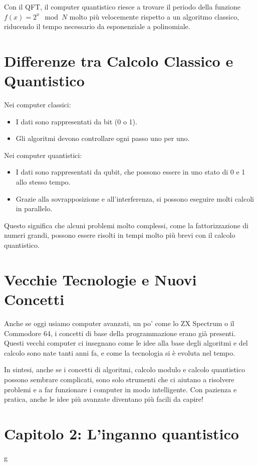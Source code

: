 \documentclass[a4paper,12pt]{book}
\begin{document}
Con il QFT, il computer quantistico riesce a trovare il periodo della funzione \( f(x)=2^x \mod N \) molto più velocemente rispetto a un algoritmo classico, riducendo il tempo necessario da esponenziale a polinomiale.

\section{Differenze tra Calcolo Classico e Quantistico}
Nei computer classici:
\begin{itemize}
  \item I dati sono rappresentati da bit (0 o 1).
  \item Gli algoritmi devono controllare ogni passo uno per uno.
\end{itemize}

Nei computer quantistici:
\begin{itemize}
  \item I dati sono rappresentati da qubit, che possono essere in uno stato di 0 e 1 allo stesso tempo.
  \item Grazie alla sovrapposizione e all'interferenza, si possono eseguire molti calcoli in parallelo.
\end{itemize}

Questo significa che alcuni problemi molto complessi, come la fattorizzazione di numeri grandi, possono essere risolti in tempi molto più brevi con il calcolo quantistico.

\section{Vecchie Tecnologie e Nuovi Concetti}
Anche se oggi usiamo computer avanzati, un po' come lo ZX Spectrum o il Commodore 64, i concetti di base della programmazione erano già presenti. Questi vecchi computer ci insegnano come le idee alla base degli algoritmi e del calcolo sono nate tanti anni fa, e come la tecnologia si è evoluta nel tempo.

\vspace{1em}
In sintesi, anche se i concetti di algoritmi, calcolo modulo e calcolo quantistico possono sembrare complicati, sono solo strumenti che ci aiutano a risolvere problemi e a far funzionare i computer in modo intelligente. Con pazienza e pratica, anche le idee più avanzate diventano più facili da capire!


\section{Capitolo 2: L'inganno quantistico}
g
\end{document}

